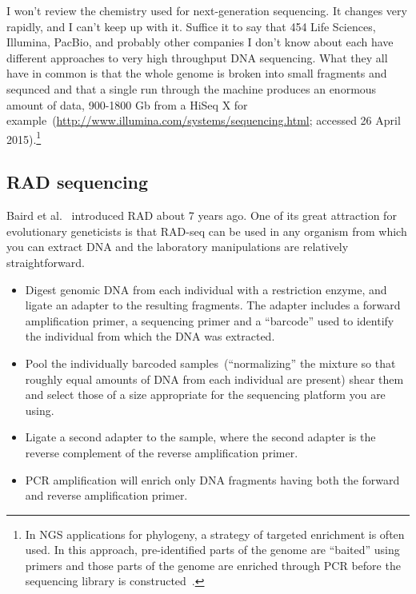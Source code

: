 I won't review the chemistry used for next-generation sequencing. It
changes very rapidly, and I can't keep up with it. Suffice it to say
that 454 Life Sciences, Illumina, PacBio, and probably other companies
I don't know about each have different approaches to very high
throughput DNA sequencing. What they all have in common is that the
whole genome is broken into small fragments and sequnced and that a
single run through the machine produces an enormous amount of data,
900-1800 Gb from a HiSeq X for
example~(\url{http://www.illumina.com/systems/sequencing.html};
accessed 26 April 2015).\footnote{In NGS applications for phylogeny, a
  strategy of targeted enrichment is often used. In this approach,
  pre-identified parts of the genome are ``baited'' using primers and
  those parts of the genome are enriched through PCR before the
  sequencing library is constructed~\cite{Lemmon-etal-2012}.} 

\subsection*{RAD sequencing}

Baird et al.~\cite{Baird-etal-2008} introduced RAD about 7 years
ago. One of its great attraction for evolutionary geneticists is that
RAD-seq can be used in any organism from which you can extract DNA and
the laboratory manipulations are relatively straightforward.

\begin{itemize}

\item Digest genomic DNA from each individual with a restriction
  enzyme, and ligate an adapter to the resulting fragments. The
  adapter includes a forward amplification primer, a sequencing primer
  and a ``barcode'' used to identify the individual from which the DNA
  was extracted.

\item Pool the individually barcoded samples~(``normalizing'' the
  mixture so that roughly equal amounts of DNA from each individual
  are present) shear them and select those of a size appropriate for
  the sequencing platform you are using.

\item Ligate a second adapter to the sample, where the second adapter
  is the reverse complement of the reverse amplification primer. 

\item PCR amplification will enrich only DNA fragments having both the
  forward and reverse amplification primer.

\end{itemize}

